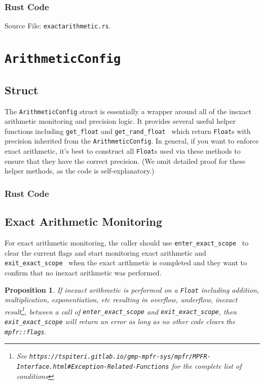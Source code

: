 \documentclass[11pt]{article}
\newtheorem{proposition}[theorem]{Proposition}
\theoremstyle{definition}
\begin{document}
\subsubsection{Rust Code}
Source File: \texttt{exactarithmetic.rs}.




\section{\texttt{ArithmeticConfig}}\label{section:arithmeticconfig}

\subsection{Struct}
The {\tt ArithmeticConfig} struct is essentially a wrapper around all of the inexact arithmetic monitoring and precision logic. It provides several useful helper functions including {\tt get\_float} and {\tt get\_rand\_float } which return {\tt Float}s with precision inherited from the {\tt ArithmeticConfig}. In general, if you want to enforce exact arithmetic, it's best to construct all {\tt Float}s used via these methods to ensure that they have the correct precision. (We omit detailed proof for these helper methods, as the code is self-explanatory.)

\subsubsection{Rust Code}

\subsection{Exact Arithmetic Monitoring}
For exact arithmetic monitoring, the caller should use {\tt enter\_exact\_scope } to clear the current flags and start monitoring exact arithmetic and {\tt exit\_exact\_scope } when the exact arithmetic is completed and they want to confirm that no inexact arithmetic was performed. 

\begin{proposition}
If inexact arithmetic is performed on a {\tt Float} including addition, multiplication, exponentiation, etc resulting in overflow, underflow, inexact result\footnote{See {\tt https://tspiteri.gitlab.io/gmp-mpfr-sys/mpfr/MPFR-Interface.html\#Exception-Related-Functions} for the complete list of conditions}, between a call of {\tt enter\_exact\_scope} and {\tt exit\_exact\_scope}, then {\tt exit\_exact\_scope}  will return an error as long as no other code clears the {\tt mpfr::flags}. 
\end{proposition}
\end{document}
